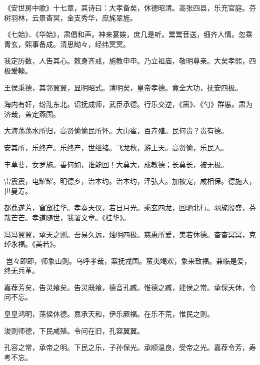 \documentclass[12pt,UTF8]{ctexbook}
\begin{document}
《安世房中歌》十七章，其诗曰：大孝备矣，休德昭清。高张四县，乐充官庭。芬树羽林，云景杳冥，金支秀华，庶旄翠旌。



《七始》、《华始》，肃倡和声。神来宴娭，庶几是听。鬻鬻音送，细齐人情。忽乘青玄，熙事备成。清思眑々，经纬冥冥。



我定历数，人告其心。敕身齐戒，施教申申。乃立祖庙，敬明尊亲。大矣孝熙，四极爰轃。



王侯秉德，其邻翼翼，显明昭式。清明矣，皇帝孝德。竟全大功，抚安四极。



海内有奸，纷乱东北。诏抚成师，武臣承德。行乐交逆，《箫》、《勺》群慝。肃为济哉，盖定燕国。



大海荡荡水所归，高贤愉愉民所怀。大山崔，百卉殖。民何贵？贵有德。



安其所，乐终产。乐终产，世继绪。飞龙秋，游上天。高贤愉，乐民人。



丰草葽，女罗施。善何如，谁能回！大莫大，成教德；长莫长，被无极。



雷震震，电耀耀。明德乡，治本约。治本约，泽弘大。加被宠，咸相保。德施大，世曼寿。



都荔遂芳，窅窊桂华。孝奏天仪，若日月光。乘玄四龙，回驰北行。羽旄殷盛，芬哉芒芒。孝道随世，我署文章。《桂华》。



冯冯翼翼，承天之则。吾易久远，烛明四极。慈惠所爱，美若休德。杳杳冥冥，克绰永福。《美若》。



岂々即即，师象山则。乌呼孝哉，案抚戎国。蛮夷竭欢，象来致福。兼临是爱，终无兵革。



嘉荐芳矣，告灵飨矣。告灵既飨，德音孔臧。惟德之臧，建侯之常。承保天休，令问不忘。



皇皇鸿明，荡侯休德。嘉承天和，伊乐厥福。在乐不荒，惟民之则。



浚则师德，下民咸殖。令问在旧，孔容翼翼。



孔容之常，承帝之明。下民之乐，子孙保光。承顺温良，受帝之光。嘉荐令芳，寿考不忘。
\end{document}
